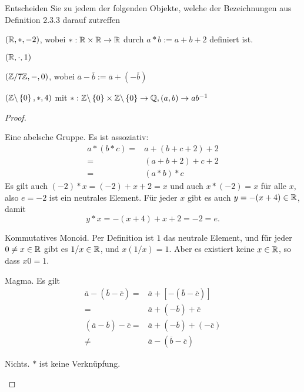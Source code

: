 \begin{Problem}
	Entscheiden Sie zu jedem der folgenden Objekte, welche der Bezeichnungen aus Definition 2.3.3 darauf zutreffen
	\begin{parts}
		\item $(\mathbb{R}, *,-2)$, wobei $*:\mathbb{R}\times \mathbb{R}\to \mathbb{R}$ durch $a*b:=a+b+2$ definiert ist.
		\item $(\mathbb{R}, \cdot, 1)$
		\item  $\left( \mathbb{Z} / 7\mathbb{Z}, -, 0 \right) $, wobei $\overline{a}-\overline{b}:=\overline{a}+(-\overline{b})$
		\item $\left( \mathbb{Z} \backslash \left\{ 0 \right\} ,*,4 \right) $ mit $*:\mathbb{Z} \backslash \left\{ 0 \right\} \times \mathbb{Z} \backslash \left\{ 0 \right\} \to \mathbb{Q}, (a,b)\to ab^{-1}$
	\end{parts}
\end{Problem}
\begin{proof}
	\begin{parts}
	\item Eine abelsche Gruppe. Es ist assoziativ:
		\begin{align*}
			a*(b*c)=&a+(b+c+2)+2\\
			=&(a+b+2)+c+2\\
			=&(a*b)*c
		\end{align*}
		Es gilt auch $(-2)*x=(-2)+x+2=x $ und auch $x*(-2)=x$ f\"{u}r alle $x$, also $e=-2$ ist ein neutrales Element. F\"{u}r jeder $x$ gibt es auch $y=-(x+4)\in \mathbb{R}$, damit
		\[
		y*x=-(x+4)+x+2=-2=e
		.\] 
	\item Kommutatives Monoid. Per Definition ist $1$ das neutrale Element, und f\"{u}r jeder $0\neq x\in \mathbb{R}$ gibt es $1 / x \in \mathbb{R}$, und $x\left( 1 / x \right) =1$. Aber es existiert keine $x\in \mathbb{R}$, so dass $x 0 = 1$.
	\item Magma. Es gilt
		\begin{align*}
			\overline{a}-(\overline{b}-\overline{c})=&\overline{a}+\left[ -\left(\overline{b}-\overline{c} \right)  \right] \\
			=&\overline{a}+(-\overline{b})+\overline{c}\\
			(\overline{a}-\overline{b})-\overline{c}=&\overline{a}+(-\overline{b})+(-\overline{c})\\
			\neq & \overline{a}-(\overline{b}-\overline{c})
		\end{align*}
	\item Nichts. $*$ ist keine Verknüpfung.
	\end{parts}
\end{proof}
